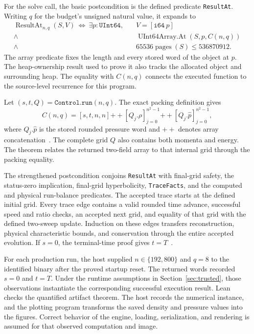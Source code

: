 \documentclass[11pt]{article}
\newcommand{\code}[1]{\texttt{#1}}
\begin{document}
For the solve call, the basic postcondition is the defined predicate \code{ResultAt}.  Writing $q$ for the budget's unsigned natural value, it expands to
\begin{equation}
\begin{split}
\operatorname{ResultAt}_{n,q}(S,V)\ \Longleftrightarrow\ \exists p:\code{UInt64},\quad
&V=[\code{i64}\ p]\\
{}\land\ &\operatorname{UInt64Array.At}(S,p,C(n,q))\\
{}\land\ &65536\operatorname{pages}(S)\leq536870912.
\end{split}
\end{equation}
The array predicate fixes the length and every stored word of the object at $p$.  The heap-ownership result used to prove it also tracks the allocated object and surrounding heap.  The equality with $C(n,q)$ connects the executed function to the source-level recurrence for this program.

Let $(s,t,Q)=\code{Control.run}(n,q)$.  The exact packing definition gives
\begin{equation}
C(n,q)=[s,t,n,n]\mathbin{+\!+}
[Q_j.\rho]_{j=0}^{n^2-1}\mathbin{+\!+}
[Q_j.\widehat p]_{j=0}^{n^2-1},
\end{equation}
where $Q_j.\widehat p$ is the stored rounded pressure word and $+\!+$ denotes array concatenation~\cite{output}.  The complete grid $Q$ also contains both momenta and energy.  The theorem relates the returned two-field array to that internal grid through the packing equality.

The strengthened postcondition conjoins \code{ResultAt} with final-grid safety, the status-zero implication, final-grid hyperbolicity, \code{TraceFacts}, and the computed and physical run-balance predicates.  The accepted trace starts at the defined initial grid.  Every trace edge contains a valid rounded time advance, successful speed and ratio checks, an accepted next grid, and equality of that grid with the defined two-sweep update.  Induction on these edges transfers reconstruction, physical characteristic bounds, and conservation through the entire accepted evolution.  If $s=0$, the terminal-time proof gives $t=T$~\cite{control,spec}.

For each production run, the host supplied $n\in\{192,800\}$ and $q=8$ to the identified binary after the proved startup reset.  The returned words recorded $s=0$ and $t=T$.  Under the runtime assumptions in Section~\ref{sec:trusted}, those observations instantiate the corresponding successful execution result.  Lean checks the quantified artifact theorem.  The host records the numerical instance, and the plotting program transforms the saved density and pressure values into the figures.  Correct behavior of the engine, loading, serialization, and rendering is assumed for that observed computation and image.
\end{document}
